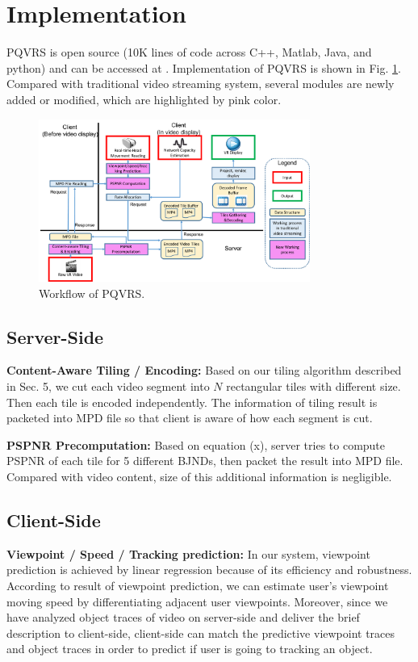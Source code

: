 \section{Implementation}

PQVRS is open source (10K lines of code across C++, Matlab, Java, and python) and can be accessed at \cite{github}. Implementation of PQVRS is shown in Fig. \ref{implementation}. Compared with traditional video streaming system, several modules are newly added or modified, which are highlighted by pink color.

\begin{figure}
  \centering
  \includegraphics[width=3.5in]{images/implementation.pdf}
  \caption{Workflow of PQVRS.}
  \label{implementation}
  \end{figure}

\subsection{Server-Side}

\textbf{Content-Aware Tiling / Encoding:} Based on our tiling algorithm described in Sec. 5, we cut each video segment into $N$ rectangular tiles with different size. Then each tile is encoded independently. The information of tiling result is packeted into MPD file so that client is aware of how each segment is cut. 

\textbf{PSPNR Precomputation:} Based on equation (x), server tries to compute PSPNR of each tile for 5 different BJNDs, then packet the result into MPD file. Compared with video content, size of this additional information is negligible.

\subsection{Client-Side}

\textbf{Viewpoint / Speed / Tracking prediction:} In our system, viewpoint prediction is achieved by linear regression because of its efficiency and robustness. According to result of viewpoint prediction, we can estimate user's viewpoint moving speed by differentiating adjacent user viewpoints. Moreover, since we have analyzed object traces of video on server-side and deliver the brief description to client-side, client-side can match the predictive viewpoint traces and object traces in order to predict if user is going to tracking an object.

